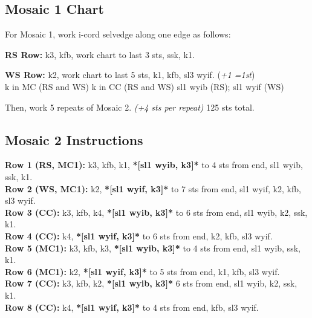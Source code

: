 \documentclass[12pt]{article}
\newcommand{\rowDir}[1]{\textbf{#1:}} %
\renewcommand{\repeat}[1]{\textbf{*[#1]*}} %
\newcommand{\increase}[1]{(\emph{+#1 
	\ifnum#1=1{st}\else{sts}\fi})}
\begin{document}
\subsection*{Mosaic 1 Chart}


For Mosaic 1, work i-cord selvedge along one edge as follows:

\hspace{2em} \rowDir{RS Row} k3, kfb, work chart to last 3 sts, ssk, k1.

\hspace{2em} \rowDir{WS Row} k2, work chart to last 5 sts, k1, kfb, sl3 wyif. \increase{1} \\

\small
\textknit{-} k in MC (RS and WS) \hspace{2em} \textknit{=} k in CC (RS and WS) \hspace{2em}
 sl1 wyib (RS); sl1 wyif (WS) \\

\normalsize \newpage

Then, work 5 repeats of Mosaic 2. \emph{(+4 sts per repeat)} 125 sts total.

\subsection*{Mosaic 2 Instructions} %

\rowDir{Row 1 (RS, MC1)} k3, kfb, k1, \repeat{sl1 wyib, k3} to 4 sts from end, sl1 wyib, ssk, k1. \\
\rowDir{Row 2 (WS, MC1)} k2, \repeat{sl1 wyif, k3} to 7 sts from end, sl1 wyif, k2, kfb, sl3 wyif. \\
\rowDir{Row 3 (CC)} k3, kfb, k4, \repeat{sl1 wyib, k3} to 6 sts from end, sl1 wyib, k2, ssk, k1. \\
\rowDir{Row 4 (CC)} k4, \repeat{sl1 wyif, k3} to 6 sts from end, k2, kfb, sl3 wyif. \\
\rowDir{Row 5 (MC1)} k3, kfb, k3, \repeat{sl1 wyib, k3} to 4 sts from end, sl1 wyib, ssk, k1. \\
\rowDir{Row 6 (MC1)} k2, \repeat{sl1 wyif, k3} to 5 sts from end, k1, kfb, sl3 wyif. \\
\rowDir{Row 7 (CC)} k3, kfb, k2, \repeat{sl1 wyib, k3} 6 sts from end, sl1 wyib, k2, ssk, k1. \\
\rowDir{Row 8 (CC)} k4, \repeat{sl1 wyif, k3} to 4 sts from end, kfb, sl3 wyif. 
\end{document}
